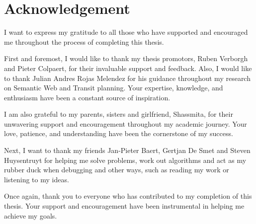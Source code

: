 \chapter*{Acknowledgement}

I want to express my gratitude to all those who have supported and encouraged me throughout the process of completing this thesis.

First and foremost, I would like to thank my thesis promotors, Ruben Verborgh and Pieter Colpaert, for their invaluable support and feedback. Also, I would like to thank Julian Andres Rojas Melendez for his guidance throughout my research on Semantic Web and Transit planning. Your expertise, knowledge, and enthusiasm have been a constant source of inspiration.

I am also grateful to my parents, sisters and girlfriend, Shassmita, for their unwavering support and encouragement throughout my academic journey. Your love, patience, and understanding have been the cornerstone of my success.

Next, I want to thank my friends Jan-Pieter Baert, Gertjan De Smet and Steven Huysentruyt for helping me solve problems, work out algorithms and act as my rubber duck when debugging and other ways, such as reading my work or listening to my ideas.

Once again, thank you to everyone who has contributed to my completion of this thesis. Your support and encouragement have been instrumental in helping me achieve my goals.
